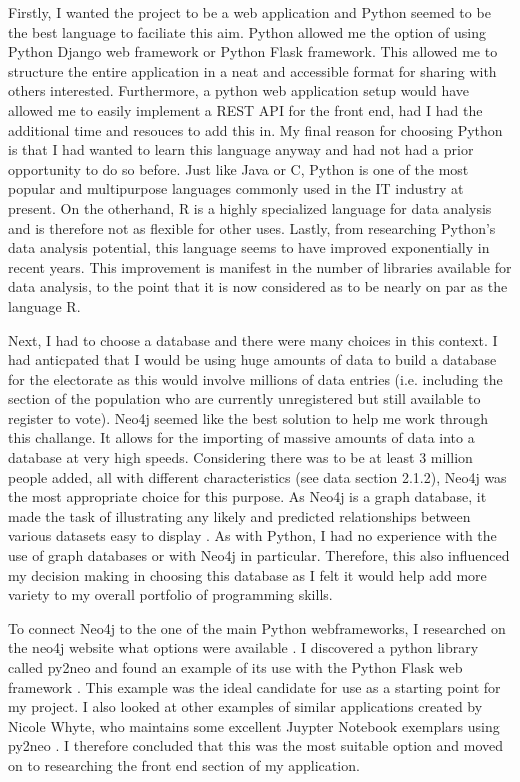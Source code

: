 Firstly, I wanted the project to be a web application and Python seemed to be the best language to faciliate this aim. Python allowed me the option of using Python Django web framework or Python Flask framework. This allowed me to structure the entire application in a neat and accessible format for sharing with others interested. Furthermore, a python web application setup would have allowed me to easily implement a REST API for the front end, had I had the additional time and resouces to add this in. My final reason for choosing Python is that I had wanted to learn this language anyway and had not had a prior opportunity to do so before. Just like Java or C, Python is one of the most popular and multipurpose languages commonly used in the IT industry at present. On the otherhand, R is a highly specialized language for data analysis and is therefore not as flexible for other uses. Lastly, from researching Python’s data analysis potential, this language seems to have improved exponentially in recent years. This improvement is manifest in the number of libraries available for data analysis, to the point that it is now considered as to be nearly on par as the language R.

Next, I had to choose a database and there were many choices in this context. I had anticpated that I would be using huge amounts of data to build a database for the electorate as this would involve millions of data entries (i.e. including the section of the population who are currently unregistered but still available to register to vote). Neo4j seemed like the best solution to help me work through this challange. It allows for the importing of massive amounts of data into a database at very high speeds. Considering there was to be at least 3 million people added, all with different characteristics (see data section 2.1.2), Neo4j was the most appropriate choice for this purpose. As Neo4j is a graph database, it made the task of illustrating any likely and predicted relationships between various datasets easy to display \cite{neo4jreasons}. As with Python, I had no experience with the use of graph databases or with Neo4j in particular. Therefore, this also influenced my decision making in choosing this database as I felt it would help add more variety to my overall portfolio of programming skills.

To connect Neo4j to the one of the main Python webframeworks, I researched on the neo4j website what options were available \cite{neo4jpython}. I discovered a python library called py2neo and found an example of its use with the Python Flask web framework \cite{nicolewhite}. This example was the ideal candidate for use as a starting point for my project. I also looked at other examples of similar applications created by Nicole Whyte, who maintains some excellent Juypter Notebook exemplars using py2neo \cite{nicolewhitejuypter}. I
therefore concluded that this was the most suitable option and moved on to researching
the front end section of my application.

